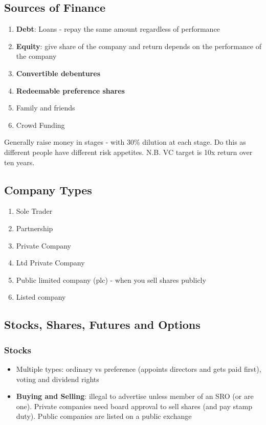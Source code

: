 \documentclass{article}
\begin{document}
\begin{multicols}{2}
\subsection{Sources of Finance}
\begin{enumerate}
    \item \textbf{Debt}: Loans - repay the same amount regardless of performance
    \item \textbf{Equity}: give share of the company and return depends on the performance of the company
    \item \textbf{Convertible debentures}
    \item \textbf{Redeemable preference shares}
    \item Family and friends
    \item Crowd Funding
    
\end{enumerate}

Generally raise money in stages - with 30\% dilution at each stage. Do this as different people have different risk appetites. N.B. VC target is 10x return over ten years.

\subsection{Company Types}
\begin{enumerate}
    \item Sole Trader
    \item Partnership
    \item Private Company
    \item Ltd Private Company
    \item Public limited company (plc) - when you sell shares publicly
    \item Listed company
\end{enumerate}

\subsection{Stocks, Shares, Futures and Options}
\subsubsection{Stocks}
\begin{itemize}
    \item Multiple types: ordinary vs preference (appoints directors and gets paid first), voting and dividend rights
    \item \textbf{Buying and Selling}: illegal to advertise unless member of an SRO (or are one). Private companies need board approval to sell shares (and pay stamp duty). Public companies are listed on a public exchange
\end{itemize}


\end{multicols}
\end{document}
